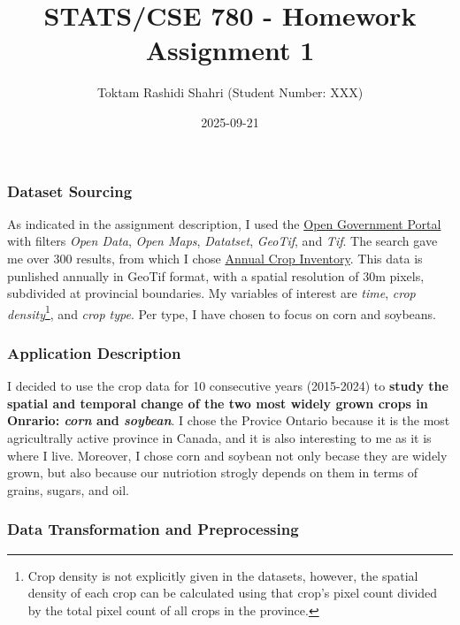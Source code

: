 \documentclass[
  11pt,
  letterpaper,
  DIV=11,
  numbers=noendperiod]{scrartcl}
\title{STATS/CSE 780 - Homework Assignment 1}
\author{Toktam Rashidi Shahri (Student Number: XXX)}
\date{2025-09-21}
\begin{document}
\maketitle


\newpage

\subsubsection{Dataset Sourcing}\label{dataset-sourcing}

As indicated in the assignment description, I used the
\href{https://search.open.canada.ca/opendata/}{Open Government Portal}
with filters \emph{Open Data}, \emph{Open Maps}, \emph{Datatset},
\emph{GeoTif}, and \emph{Tif}. The search gave me over 300 results, from
which I chose
\href{https://open.canada.ca/data/en/dataset/ba2645d5-4458-414d-b196-6303ac06c1c9}{Annual
Crop Inventory}. This data is punlished annually in GeoTif format, with
a spatial resolution of 30m pixels, subdivided at provincial boundaries.
My variables of interest are \emph{time}, \emph{crop
density}\footnote{Crop density is not explicitly given in the datasets,
  however, the spatial density of each crop can be calculated using that
  crop's pixel count divided by the total pixel count of all crops in
  the province.}, and \emph{crop type}. Per type, I have chosen to focus
on corn and soybeans.

\subsubsection{Application Description}\label{application-description}

I decided to use the crop data for 10 consecutive years (2015-2024) to
\textbf{study the spatial and temporal change of the two most widely
grown crops in Onrario: \emph{corn} and \emph{soybean}}. I chose the
Provice Ontario because it is the most agricultrally active province in
Canada, and it is also interesting to me as it is where I live.
Moreover, I chose corn and soybean not only becase they are widely
grown, but also because our nutriotion strogly depends on them in terms
of grains, sugars, and oil.

\subsubsection{Data Transformation and
Preprocessing}\label{data-transformation-and-preprocessing}
\end{document}
